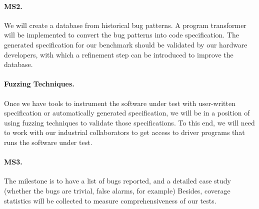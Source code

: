\documentclass[fleqn,12pt]{article}
\begin{document}
\paragraph{MS2.} We will create  a database from historical  bug patterns. A program transformer will be implemented to convert the bug patterns
into code specification. The generated specification for our benchmark
should be validated by our hardware developers, with which a
refinement step can be introduced to improve the database.





\paragraph{Fuzzing Techniques.}
Once we have tools to instrument the software under test with user-written
specification or automatically generated specification, we will be in a position of using fuzzing techniques
to validate those specifications. To this end, we will need to work
with our industrial collaborators to get access to driver programs
that runs the software under test.

\paragraph{MS3.} The milestone  is to have a list of bugs reported, and a detailed case study (whether the bugs are
trivial, false alarms, for example) Besides, coverage statistics will
be collected to measure comprehensiveness of our tests.



\end{document}
